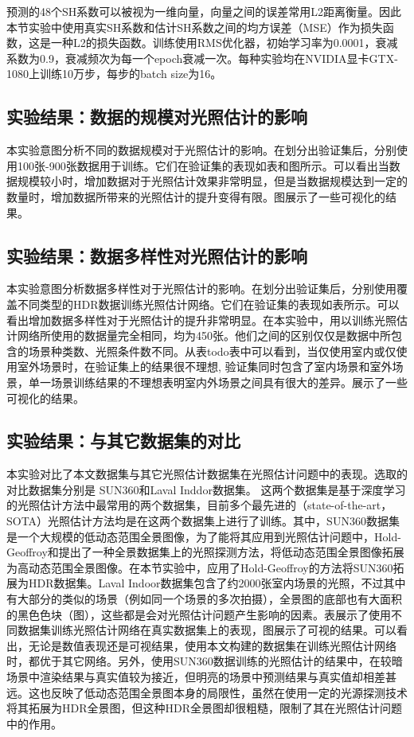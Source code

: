 预测的48个SH系数可以被视为一维向量，向量之间的误差常用L2距离衡量。因此本节实验中使用真实SH系数和估计SH系数之间的均方误差（MSE）作为损失函数，这是一种L2的损失函数。训练使用RMS优化器\cite{tieleman2012lecture}，初始学习率为0.0001，衰减系数为0.9，衰减频次为每一个epoch衰减一次。每种实验均在NVIDIA显卡GTX-1080上训练10万步，每步的batch size为16。
\subsection{实验结果：数据的规模对光照估计的影响}
本实验意图分析不同的数据规模对于光照估计的影响。在划分出验证集后，分别使用100张-900张数据用于训练。它们在验证集的表现如表和图所示。可以看出当数据规模较小时，增加数据对于光照估计效果非常明显，但是当数据规模达到一定的数量时，增加数据所带来的光照估计的提升变得有限。图展示了一些可视化的结果。
\subsection{实验结果：数据多样性对光照估计的影响}
本实验意图分析数据多样性对于光照估计的影响。在划分出验证集后，分别使用覆盖不同类型的HDR数据训练光照估计网络。它们在验证集的表现如表所示。可以看出增加数据多样性对于光照估计的提升非常明显。在本实验中，用以训练光照估计网络所使用的数据量完全相同，均为450张。他们之间的区别仅仅是数据中所包含的场景种类数、光照条件数不同。从表todo{表}中可以看到，当仅使用室内或仅使用室外场景时，在验证集上的结果很不理想, 验证集同时包含了室内场景和室外场景，单一场景训练结果的不理想表明室内外场景之间具有很大的差异。展示了一些可视化的结果。
\subsection{实验结果：与其它数据集的对比}
本实验对比了本文数据集与其它光照估计数据集在光照估计问题中的表现。选取的对比数据集分别是
SUN360\cite{xiao2012recognizing}和Laval Inddor\cite{gardner2017learning}数据集。
这两个数据集是基于深度学习的光照估计方法中最常用的两个数据集，目前多个最先进的（state-of-the-art，SOTA）光照估计方法均是在这两个数据集上进行了训练。其中，SUN360数据集是一个大规模的低动态范围全景图像，为了能将其应用到光照估计问题中，Hold-Geoffroy\cite{hold2017deep}和\cite{gardner2017learning}提出了一种全景数据集上的光照探测方法，将低动态范围全景图像拓展为高动态范围全景图像。在本节实验中，应用了Hold-Geoffroy的方法将SUN360拓展为HDR数据集。Laval Indoor数据集包含了约2000张室内场景的光照，不过其中有大部分的类似的场景（例如同一个场景的多次拍摄），全景图的底部也有大面积的黑色色块（图），这些都是会对光照估计问题产生影响的因素。表展示了使用不同数据集训练光照估计网络在真实数据集上的表现，图展示了可视的结果。可以看出，无论是数值表现还是可视结果，使用本文构建的数据集在训练光照估计网络时，都优于其它网络。另外，使用SUN360数据训练的光照估计的结果中，在较暗场景中渲染结果与真实值较为接近，但明亮的场景中预测结果与真实值却相差甚远。这也反映了低动态范围全景图本身的局限性，虽然在使用一定的光源探测技术将其拓展为HDR全景图，但这种HDR全景图却很粗糙，限制了其在光照估计问题中的作用。


